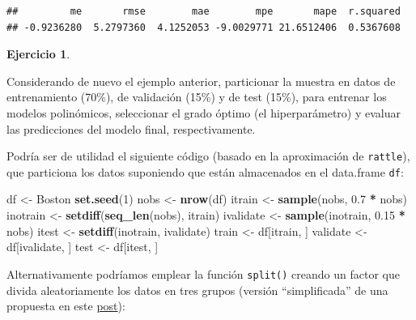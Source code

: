 \documentclass[
  spanish,
]{book}
\newenvironment{Shaded}{\begin{snugshade}}{\end{snugshade}}
\newcommand{\DecValTok}[1]{\textcolor[rgb]{0.00,0.00,0.81}{#1}}
\newcommand{\FloatTok}[1]{\textcolor[rgb]{0.00,0.00,0.81}{#1}}
\newcommand{\KeywordTok}[1]{\textcolor[rgb]{0.13,0.29,0.53}{\textbf{#1}}}
\newcommand{\NormalTok}[1]{#1}
\newcommand{\OperatorTok}[1]{\textcolor[rgb]{0.81,0.36,0.00}{\textbf{#1}}}
\newcommand{\StringTok}[1]{\textcolor[rgb]{0.31,0.60,0.02}{#1}}
\theoremstyle{break}
\theoremstyle{definition}
\theoremstyle{definition}
\theoremstyle{definition}
\newtheorem{exercise}{Ejercicio}[chapter]
\theoremstyle{remark}
\begin{document}
\begin{verbatim}
##         me       rmse        mae        mpe       mape  r.squared 
## -0.9236280  5.2797360  4.1252053 -9.0029771 21.6512406  0.5367608
\end{verbatim}

\begin{exercise}
\protect\hypertarget{exr:train-validate-test}{}{\label{exr:train-validate-test} }
\end{exercise}

Considerando de nuevo el ejemplo anterior, particionar la muestra en datos de entrenamiento (70\%), de validación (15\%) y de test (15\%), para entrenar los modelos polinómicos, seleccionar el grado óptimo (el hiperparámetro) y evaluar las predicciones del modelo final, respectivamente.

Podría ser de utilidad el siguiente código (basado en la aproximación de \texttt{rattle}), que particiona los datos suponiendo que están almacenados en el data.frame \texttt{df}:

\begin{Shaded}
\begin{Highlighting}[]
\NormalTok{df <-}\StringTok{ }\NormalTok{Boston}
\KeywordTok{set.seed}\NormalTok{(}\DecValTok{1}\NormalTok{)}
\NormalTok{nobs <-}\StringTok{ }\KeywordTok{nrow}\NormalTok{(df)}
\NormalTok{itrain <-}\StringTok{ }\KeywordTok{sample}\NormalTok{(nobs, }\FloatTok{0.7} \OperatorTok{*}\StringTok{ }\NormalTok{nobs)}
\NormalTok{inotrain <-}\StringTok{ }\KeywordTok{setdiff}\NormalTok{(}\KeywordTok{seq_len}\NormalTok{(nobs), itrain)}
\NormalTok{ivalidate <-}\StringTok{ }\KeywordTok{sample}\NormalTok{(inotrain, }\FloatTok{0.15} \OperatorTok{*}\StringTok{ }\NormalTok{nobs)}
\NormalTok{itest <-}\StringTok{ }\KeywordTok{setdiff}\NormalTok{(inotrain, ivalidate)}
\NormalTok{train <-}\StringTok{ }\NormalTok{df[itrain, ]}
\NormalTok{validate <-}\StringTok{ }\NormalTok{df[ivalidate, ]}
\NormalTok{test <-}\StringTok{ }\NormalTok{df[itest, ]}
\end{Highlighting}
\end{Shaded}

Alternativamente podríamos emplear la función \texttt{split()} creando un factor que divida aleatoriamente los datos en tres grupos (versión ``simplificada'' de una propuesta en este \href{https://stackoverflow.com/questions/36068963/r-how-to-split-a-data-frame-into-training-validation-and-test-sets}{post}):
\end{document}
